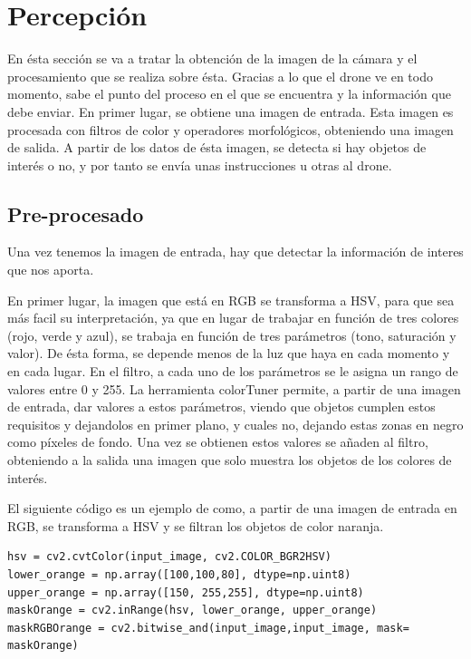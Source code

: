 \section{Percepci\'on}

\hspace{1 cm} En \'esta secci\'on se va a tratar la obtenci\'on de la imagen de la c\'amara y el procesamiento que se realiza sobre \'esta. Gracias a lo que el drone ve en todo momento, sabe el punto del proceso en el que se encuentra y la informaci\'on que debe enviar. En primer lugar, se obtiene una imagen de entrada. Esta imagen es procesada con filtros de color y operadores morfol\'ogicos, obteniendo una imagen de salida. A partir de los datos de \'esta imagen, se detecta si hay objetos de inter\'es o no, y por tanto se env\'ia unas instrucciones u otras al drone. 


\subsection{Pre-procesado}

\hspace{1 cm} Una vez tenemos la imagen de entrada, hay que detectar la informaci\'on de interes que nos aporta. 
 
\hspace{1 cm} En primer lugar, la imagen que est\'a en RGB se transforma a HSV, para que sea m\'as facil su interpretaci\'on, ya que en lugar de trabajar en funci\'on de tres colores (rojo, verde y azul), se trabaja en funci\'on de tres par\'ametros (tono, saturaci\'on y valor). De \'esta forma, se depende menos de la luz que haya en cada momento y en cada lugar. En el filtro, a cada uno de los par\'ametros se le asigna un rango de valores entre 0 y 255. La herramienta colorTuner permite, a partir de una imagen de entrada, dar valores a estos par\'ametros, viendo que objetos cumplen estos requisitos y dejandolos en primer plano, y cuales no, dejando estas zonas en negro como p\'ixeles de fondo. Una vez se obtienen estos valores se añaden al filtro, obteniendo a la salida una imagen que solo muestra los objetos de los colores de inter\'es. 

\hspace{1 cm} El siguiente c\'odigo es un ejemplo de como, a partir de una imagen de entrada en RGB, se transforma a HSV y se filtran los objetos de color naranja. 

\begin{lstlisting}[backgroundcolor=\color{yellow}]
hsv = cv2.cvtColor(input_image, cv2.COLOR_BGR2HSV)
lower_orange = np.array([100,100,80], dtype=np.uint8)
upper_orange = np.array([150, 255,255], dtype=np.uint8)
maskOrange = cv2.inRange(hsv, lower_orange, upper_orange)
maskRGBOrange = cv2.bitwise_and(input_image,input_image, mask= maskOrange)
\end{lstlisting}



